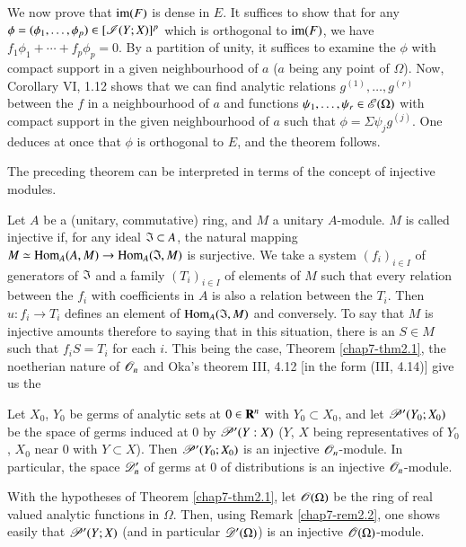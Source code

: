 We now prove that $\operatorname{im}(F)$ is dense in $E$. It suffices to show that for any $\phi=(\phi_{1},\ldots,\phi_{p})\in [\mathscr{I}(Y;X)]^{p}$ which is orthogonal to $\operatorname{im}(F)$, we have $f_{1}\phi_{1}+\cdots+f_{p}\phi_{p}=0$. By a partition of unity, it suffices to examine the $\phi$ with compact support in a given neighbourhood of $a$ ($a$ being any point of $\Omega$). Now, Corollary VI, 1.12 shows that we can find analytic relations $g^{(1)},\ldots,g^{(r)}$ between the $f$ in a neighbourhood of $a$ and functions $\psi_{1},\ldots,\psi_{r}\in \mathscr{E}(\Omega)$ with compact support in the given neighbourhood of $a$ such that $\phi=\Sigma\psi_{j}g^{(j)}$. One deduces at once that $\phi$ is orthogonal to $E$, and the theorem follows.

The preceding theorem can be interpreted in terms of the concept of injective modules.

Let $A$ be a (unitary, commutative) ring, and $M$ a unitary $A$-module. $M$ is called injective if, for any ideal $\mathfrak{I}\subset A$, the natural mapping $M\simeq \operatorname{Hom}_{A}(A,M)\to \operatorname{Hom}_{A}(\mathfrak{I},M)$ is surjective. We take a system $(f_{i})_{i\in I}$ of generators of $\mathfrak{I}$ and a family $(T_{i})_{i\in I}$ of elements of $M$ such that every relation between the $f_{i}$ with coefficients in $A$ is also a relation between the $T_{i}$. Then $u:f_{i}\to T_{i}$ defines an element of $\operatorname{Hom}_{A}(\mathfrak{I},M)$ and conversely. To say that $M$ is injective amounts therefore to saying that in this situation, there is an $S\in M$ such that $f_{i}S=T_{i}$ for each $i$. This being the case, Theorem \ref{chap7-thm2.1}, the noetherian nature of $\mathscr{O}_{n}$ and Oka's theorem III, 4.12 [in the form (III, 4.14)] give us the

\begin{theorem}\label{chap7-thm2.4}
Let $X_{0}$, $Y_{0}$ be germs of analytic sets at $0\in \mathbf{R}^{n}$ with $Y_{0}\subset X_{0}$, and let $\mathscr{P}'(Y_{0};X_{0})$ be the space of germs induced at $0$ by $\mathscr{P}'(Y:X)$ ($Y$, $X$ being representatives of $Y_{0}$, $X_{0}$ near $0$ with $Y\subset X$). Then $\mathscr{P}'(Y_{0};X_{0})$ is an injective $\mathscr{O}_{n}$-module. In particular, the space $\mathscr{D}'_{n}$ of germs at $0$ of distributions is an injective $\mathscr{O}_{n}$-module.
\end{theorem}

\begin{remark}\label{chap7-rem2.5}
With the hypotheses of Theorem \ref{chap7-thm2.1}, let $\mathscr{O}(\Omega)$ be the ring of real valued analytic functions in $\Omega$. Then, using Remark \ref{chap7-rem2.2}, one shows easily that $\mathscr{P}'(Y;X)$ (and in particular $\mathscr{D}'(\Omega)$) is an injective $\mathscr{O}(\Omega)$-module.
\end{remark}


